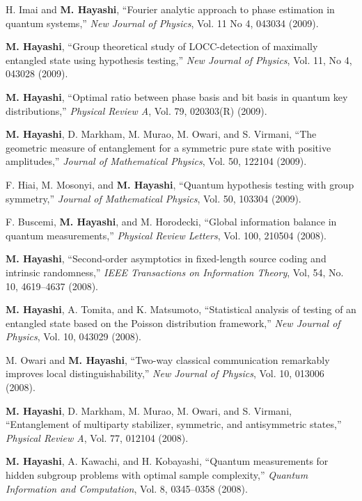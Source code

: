 \documentclass[a4paper,12pt,oneside]{article}
\begin{document}
\begin{enumerate}
	H. Imai and \textbf{M. Hayashi}, 
``Fourier analytic approach to phase estimation in quantum systems,'' 
{\em New Journal of Physics}, Vol. 11 No 4, 043034 (2009). 

	\textbf{M. Hayashi}, 
``Group theoretical study of LOCC-detection of maximally entangled state using hypothesis testing,'' 
{\em New Journal of Physics}, Vol. 11, No 4, 043028 (2009).

	\textbf{M. Hayashi}, 
``Optimal ratio between phase basis and bit basis in quantum key distributions,'' 
{\em Physical Review A}, Vol. 79, 020303(R) (2009).

	\textbf{M. Hayashi}, D. Markham, M. Murao, M. Owari, and S. Virmani, 
``The geometric measure of entanglement for a symmetric pure state with positive amplitudes,'' 
{\em Journal of Mathematical Physics}, Vol. 50, 122104 (2009). 

	F. Hiai, M. Mosonyi, and \textbf{M. Hayashi}, 
``Quantum hypothesis testing with group symmetry,''
{\em Journal of Mathematical Physics}, Vol. 50, 103304 (2009).

	F. Buscemi, \textbf{M. Hayashi}, and M. Horodecki, 
``Global information balance in quantum measurements,'' 
{\em Physical Review Letters}, Vol. 100, 210504 (2008).

	\textbf{M. Hayashi}, 
``Second-order asymptotics in fixed-length source coding and intrinsic randomness,'' 
{\em IEEE Transactions on Information Theory}, Vol, 54, No. 10, 4619--4637 (2008). 

	\textbf{M. Hayashi}, A. Tomita, and K. Matsumoto, 
``Statistical analysis of testing of an entangled state based on the Poisson distribution framework,'' 
{\em New Journal of Physics}, Vol. 10, 043029 (2008).

	M. Owari and \textbf{M. Hayashi}, 
``Two-way classical communication remarkably improves local distinguishability,'' 
{\em New Journal of Physics}, Vol. 10, 013006 (2008).

 \textbf{M. Hayashi}, D. Markham, M. Murao, M. Owari, and S. Virmani, 
``Entanglement of multiparty stabilizer, symmetric, and antisymmetric states,'' 
{\em Physical Review A}, Vol. 77, 012104 (2008).

\textbf{M. Hayashi}, A. Kawachi, and H. Kobayashi, 
``Quantum measurements for hidden subgroup problems with optimal sample complexity,'' 
{\em Quantum Information and Computation}, Vol. 8, 0345--0358 (2008). 


\end{enumerate}
\end{document}
